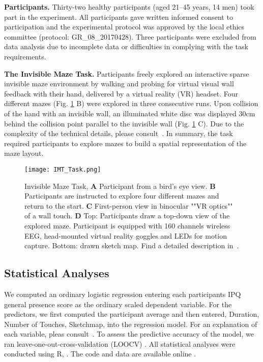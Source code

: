 
\indent \textbf{Participants.} Thirty-two healthy participants (aged 21--45 years, 14 men) took part in the
experiment. All participants gave written informed consent to participation and the experimental protocol was approved by the local ethics committee (protocol: GR\_08\_20170428). Three participants were excluded from data analysis due to incomplete data or difficulties in complying with the task requirements.

\indent \textbf{The Invisible Maze Task.} Participants freely explored an interactive sparse invisible maze environment by walking and probing for virtual visual wall feedback with their hand, delivered by a virtual reality (VR) headset. Four different mazes (Fig. \ref{imt_task} B) were explored in three consecutive runs. Upon collision of the hand with an invisible wall, an illuminated white disc was displayed 30cm behind the collision point parallel to the invisible wall (Fig. \ref{imt_task} C). Due to the complexity of the technical details, please consult~\cite{gehrke2018}. In summary, the task required participants to explore mazes to build a spatial representation of the maze layout.%

\begin{figure}[h]
\centering
\texttt{[image: IMT\_Task.png]}
\vspace{0pt}
\caption{Invisible Maze Task, \textbf{A} Participant from a bird’s eye view. \textbf{B} Participants are instructed to explore four different mazes and return to the start. \textbf{C} First-person view in binocular ""VR optics"" of a wall touch. \textbf{D} Top: Participants draw a top-down view of the explored maze. Participant is equipped with 160 channels wireless EEG, head-mounted virtual reality goggles and LEDs for motion capture. Bottom: drawn sketch map. Find a detailed description in~\cite{gehrke2018}.}
\label{imt_task}
\end{figure}

\subsection{Statistical Analyses}
We computed an ordinary logistic regression entering each participants IPQ general presence score as the ordinary scaled dependent variable. For the predictors, we first computed the participant average and then entered, Duration, Number of Touches, Sketchmap,   into the regression model. For an explanation of each variable, pleas consult~\cite{gehrke2018}. To assess the predictive accuracy of the model, we ran leave-one-out-cross-validation (LOOCV) . All statistical analyses were conducted using R, . The code and data are available online .
